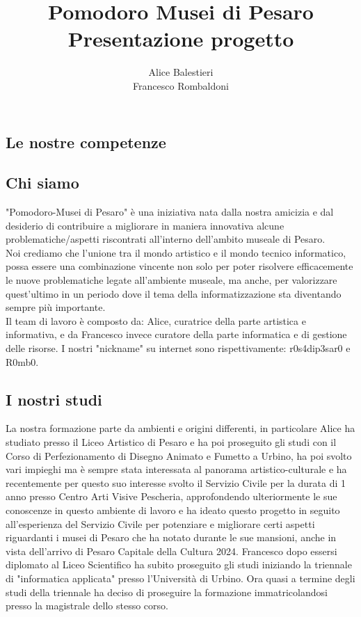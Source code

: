 \documentclass[hidelinks,12pt,a4paper]{article}
\begin{document}
	\begin{flushleft}
		
		\title{\textbf{Pomodoro Musei di Pesaro}\\\small{Presentazione progetto}}
		\author{Alice Balestieri\\ Francesco Rombaldoni}
		\date{}
		
		\maketitle
		
		\setcounter{page}{1}
		\newpage
		\tableofcontents
		\newpage
			
			\section{Le nostre competenze}
				\subsection{Chi siamo}
				"Pomodoro-Musei di Pesaro" è una iniziativa nata dalla nostra amicizia e dal desiderio di contribuire a migliorare in maniera innovativa alcune problematiche/aspetti riscontrati all'interno dell'ambito museale di Pesaro.\\
				Noi crediamo che l'unione tra il mondo artistico e il mondo tecnico informatico, possa essere una combinazione vincente non solo per poter risolvere efficacemente le nuove problematiche legate all'ambiente museale, ma anche, per valorizzare quest'ultimo in un periodo dove il tema della informatizzazione sta diventando sempre più importante.\\
				Il team di lavoro è composto da: Alice, curatrice della parte artistica e informativa, e da Francesco invece curatore della parte informatica e di gestione delle risorse. I nostri "nickname" su internet sono rispettivamente: r0s4dip3sar0 e R0mb0. 
				
				\subsection{I nostri studi}
				La nostra formazione parte da ambienti e origini differenti, in particolare Alice ha studiato presso il Liceo Artistico di Pesaro e ha poi proseguito gli studi con il Corso di Perfezionamento di Disegno Animato e Fumetto a Urbino, ha poi svolto vari impieghi ma è sempre stata interessata al panorama artistico-culturale e ha recentemente per questo suo interesse svolto il Servizio Civile per la durata di 1 anno presso Centro Arti Visive Pescheria, approfondendo ulteriormente le sue conoscenze in questo ambiente di lavoro e ha ideato questo progetto in seguito all'esperienza del Servizio Civile per potenziare e migliorare certi aspetti riguardanti i musei di Pesaro che ha notato durante le sue mansioni, anche in vista dell'arrivo di Pesaro Capitale della Cultura 2024. 
				Francesco dopo essersi diplomato al Liceo Scientifico ha subito proseguito gli studi iniziando la triennale di "informatica applicata" presso l'Università di Urbino. Ora quasi a termine degli studi della triennale ha deciso di proseguire la formazione immatricolandosi presso la magistrale dello stesso corso. 
				

\end{flushleft}
\end{document}
